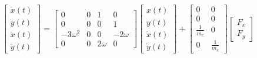 
\begin{equation}
    \label{eq:inplaneXY_NASA}
\begin{bmatrix}
\dot{x}(t) \\
\dot{y}(t) \\
\ddot{x}(t) \\
\ddot{y}(t)
\end{bmatrix}
=
\begin{bmatrix}
0 & 0 & 1 & 0 \\
0 & 0 & 0 & 1 \\
-3\omega^2 & 0 & 0 & -2\omega \\
0 & 0 & 2\omega & 0
\end{bmatrix}
\begin{bmatrix}
x(t) \\
y(t) \\
\dot{x}(t) \\
\dot{y}(t)
\end{bmatrix}
+
\begin{bmatrix}
0 & 0 \\
0 & 0 \\
\frac{1}{m_c} & 0 \\
0 & \frac{1}{m_c}
\end{bmatrix}
\begin{bmatrix}
F_x \\
F_y
\end{bmatrix}
\end{equation}


